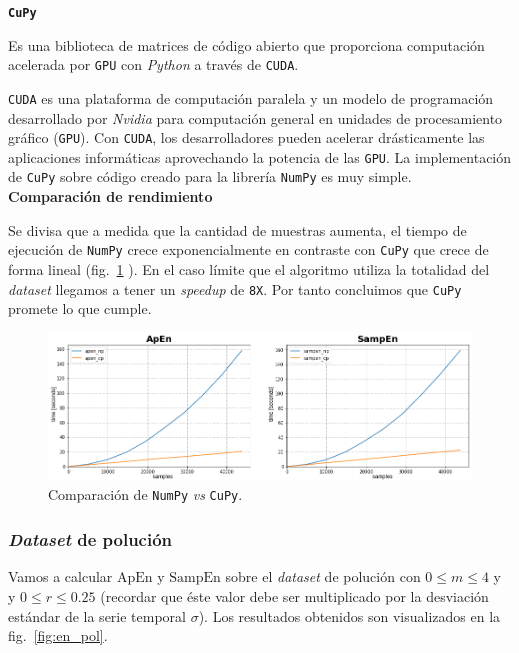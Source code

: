 \documentclass[a4paper,12pt]{article}
\begin{document}
\textbf{\texttt{CuPy}}

Es una biblioteca de matrices de código abierto que proporciona computación acelerada por \texttt{GPU} con \textit{Python} a través de \texttt{CUDA}. \citep{CuPy} 

\texttt{CUDA} es una plataforma de computación paralela y un modelo de programación desarrollado por \textit{Nvidia} para computación general en unidades de procesamiento gráfico (\texttt{GPU}). Con \texttt{CUDA}, los desarrolladores pueden acelerar drásticamente las aplicaciones informáticas aprovechando la potencia de las \texttt{GPU}. \citep{CUDA} La implementación de \texttt{CuPy} sobre código creado para la librería \texttt{NumPy} es muy simple.\\

\textbf{Comparación de rendimiento}

Se divisa que a medida que la cantidad de muestras aumenta, el tiempo de ejecución de \texttt{NumPy} crece exponencialmente en contraste con \texttt{CuPy} que crece de forma lineal (fig.~\ref{fig:np_vs_cp} ). En el caso límite que el algoritmo utiliza la totalidad del \textit{dataset} llegamos a tener un \textit{speedup} de \texttt{8X}. Por tanto concluimos que \texttt{CuPy} promete lo que cumple.

\begin{figure}[H]
	\begin{center}
	\includegraphics[width=1\textwidth]{numpy_vs_cupy.png}
  	\caption{Comparación de \texttt{NumPy} \textit{vs} \texttt{CuPy}.}
  	\label{fig:np_vs_cp}
  	\end{center}
\end{figure}

\subsubsection{\textit{Dataset} de polución}
Vamos a calcular $\textrm{ApEn}$ y $\textrm{SampEn}$ sobre el \textit{dataset} de polución con $0 \leq m \leq 4$ y y $0 \leq r \leq 0.25$ (recordar que éste valor debe ser multiplicado por la desviación estándar de la serie temporal $\sigma$). Los resultados obtenidos son visualizados en la fig.~\ref{fig:en_pol}.
\end{document}

